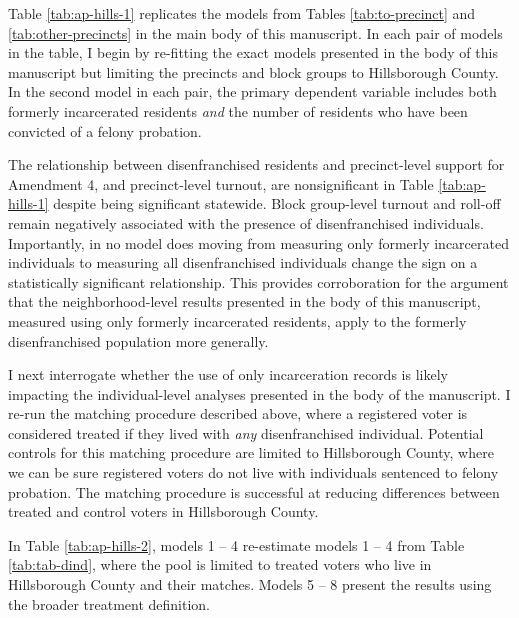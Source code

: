 \documentclass[
  12pt,
]{article}
\begin{document}
Table \ref{tab:ap-hills-1} replicates the models from Tables \ref{tab:to-precinct} and \ref{tab:other-precincts} in the main body of this manuscript. In each pair of models in the table, I begin by re-fitting the exact models presented in the body of this manuscript but limiting the precincts and block groups to Hillsborough County. In the second model in each pair, the primary dependent variable includes both formerly incarcerated residents \emph{and} the number of residents who have been convicted of a felony probation.

\begin{singlespace}


\end{singlespace}

The relationship between disenfranchised residents and precinct-level support for Amendment 4, and precinct-level turnout, are nonsignificant in Table \ref{tab:ap-hills-1} despite being significant statewide. Block group-level turnout and roll-off remain negatively associated with the presence of disenfranchised individuals. Importantly, in no model does moving from measuring only formerly incarcerated individuals to measuring all disenfranchised individuals change the sign on a statistically significant relationship. This provides corroboration for the argument that the neighborhood-level results presented in the body of this manuscript, measured using only formerly incarcerated residents, apply to the formerly disenfranchised population more generally.

I next interrogate whether the use of only incarceration records is likely impacting the individual-level analyses presented in the body of the manuscript. I re-run the matching procedure described above, where a registered voter is considered treated if they lived with \emph{any} disenfranchised individual. Potential controls for this matching procedure are limited to Hillsborough County, where we can be sure registered voters do not live with individuals sentenced to felony probation. The matching procedure is successful at reducing differences between treated and control voters in Hillsborough County.

In Table \ref{tab:ap-hills-2}, models 1 -- 4 re-estimate models 1 -- 4 from Table \ref{tab:tab-dind}, where the pool is limited to treated voters who live in Hillsborough County and their matches. Models 5 -- 8 present the results using the broader treatment definition.

\begin{singlespace}

\end{singlespace}
\end{document}
